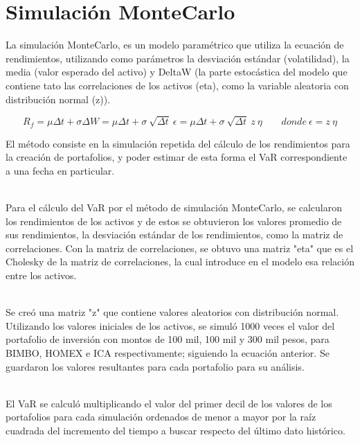 \documentclass[12pt]{article}
\begin{document}
\section{Simulación MonteCarlo}

La simulación MonteCarlo, es un modelo paramétrico que utiliza la ecuación de rendimientos, utilizando como parámetros la desviación estándar (volatilidad), la media (valor esperado del activo) y DeltaW (la parte estocástica del modelo que contiene tato las correlaciones de los activos (eta), como la variable aleatoria con distribución normal (z)).

$$ R_{f}= \mu\Delta t + \sigma\Delta W  = \mu\Delta t + \sigma \: \sqrt{\Delta t} \: \epsilon = \mu\Delta t + \sigma  \: \sqrt{\Delta t} \: z \: \eta \: \: \: \: \: \: \: \: \: donde \: \epsilon = z \: \eta$$

El método consiste en la simulación repetida del cálculo de los rendimientos para la creación de portafolios, y poder estimar de esta forma el VaR correspondiente a una fecha en particular.

\ \\%
Para el cálculo del VaR por el método de simulación MonteCarlo, se calcularon los rendimientos de los activos y de estos se obtuvieron los valores promedio de sus rendimientos, la desviación estándar de los rendimientos, como la matriz de correlaciones. Con la matriz de correlaciones, se obtuvo una matriz "eta" que es el Cholesky de la matriz de correlaciones, la cual introduce en el modelo esa relación entre los activos. 

\ \\%
Se creó una matriz "z" que contiene valores aleatorios con distribución normal. Utilizando los valores iniciales de los activos, se simuló 1000 veces el valor del portafolio de inversión con montos de 100 mil, 100 mil y 300 mil pesos, para BIMBO, HOMEX e ICA respectivamente; siguiendo la ecuación anterior. Se guardaron los valores resultantes para cada portafolio para su análisis.

\ \\%
El VaR se calculó multiplicando el valor del primer decil de los valores de los portafolios para cada simulación ordenados de menor a mayor por la raíz cuadrada del incremento del tiempo a buscar respecto del último dato histórico.
\end{document}
